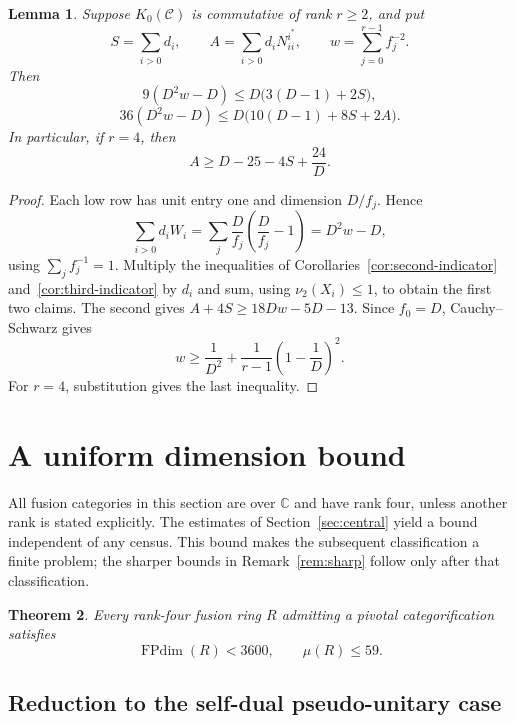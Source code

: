 \documentclass[11pt]{amsart}
\newtheorem{theorem}{Theorem}[section]
\newtheorem{lemma}[theorem]{Lemma}
\theoremstyle{definition}
\DeclareMathOperator{\FPdim}{FPdim}
\newcommand{\C}{\mathbb C}
\numberwithin{equation}{section}
\begin{document}
\begin{samepage}
\begin{lemma}\label{lem:short-moments}
Suppose $K_0(\mathcal C)$ is commutative of rank $r\geq2$, and put
\[
 S=\sum_{i>0}d_i,\qquad A=\sum_{i>0}d_iN_{ii}^{i^*},\qquad
 w=\sum_{j=0}^{r-1}f_j^{-2}.
\]
Then
\begin{equation}\label{eq:short-second-moment}
 9(D^2w-D)\leq D\bigl(3(D-1)+2S\bigr),
\end{equation}
\[
 36(D^2w-D)\leq D\bigl(10(D-1)+8S+2A\bigr).
\]
In particular, if $r=4$, then
\begin{equation}\label{eq:short-diagonal-lower}
 A\geq D-25-4S+\frac{24}{D}.
\end{equation}
\end{lemma}
\end{samepage}
\begin{proof}
Each low row has unit entry one and dimension $D/f_j$. Hence
\[
 \sum_{i>0}d_iW_i
 =\sum_j\frac D{f_j}\left(\frac D{f_j}-1\right)=D^2w-D,
\]
using $\sum_jf_j^{-1}=1$. Multiply the inequalities of
Corollaries~\ref{cor:second-indicator} and~\ref{cor:third-indicator}
by $d_i$ and sum, using $\nu_2(X_i)\leq1$, to obtain the first two claims.
The second gives $A+4S\geq18Dw-5D-13$.
Since $f_0=D$, Cauchy--Schwarz gives
\[
 w\geq\frac1{D^2}+\frac1{r-1}\left(1-\frac1D\right)^2.
\]
For $r=4$, substitution gives the last inequality.
\end{proof}

\section{A uniform dimension bound}\label{sec:uniform}
All fusion categories in this section are over $\C$ and have rank four,
unless another rank is stated explicitly. The estimates of
Section~\ref{sec:central} yield a bound independent of
any census. This bound makes the subsequent classification a finite
problem; the sharper bounds in Remark~\ref{rem:sharp} follow only
after that classification.
\begin{theorem}\label{thm:uniform}
Every rank-four fusion ring $R$ admitting a pivotal categorification satisfies
\[
 \FPdim(R)<3600,\qquad \mu(R)\leq59.
\]
\end{theorem}
\subsection{Reduction to the self-dual pseudo-unitary case}\label{sec:pivotal-reduction}
\end{document}
